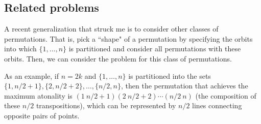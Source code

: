 \subsection{Related problems}

A recent generalization that struck me is to consider other classes of permutations. That is, pick a ``shape" of a permutation by specifying the orbits into which $\{1,\ldots,n\}$ is partitioned and consider all permutations with these orbits. Then, we can consider the problem for this class of permutations.

As an example, if $n=2k$ and $\{1,\ldots,n\}$ is partitioned into the sets $\{1,n/2+1\},\{2,n/2+2\},\ldots,\{n/2,n\}$, then the permutation that achieves the maximum atonality is $(1\ n/2+1)(2\ n/2+2)\cdots (n/2\ n)$ (the composition of these $n/2$ transpositions), which can be represented by $n/2$ lines connecting opposite pairs of points.

